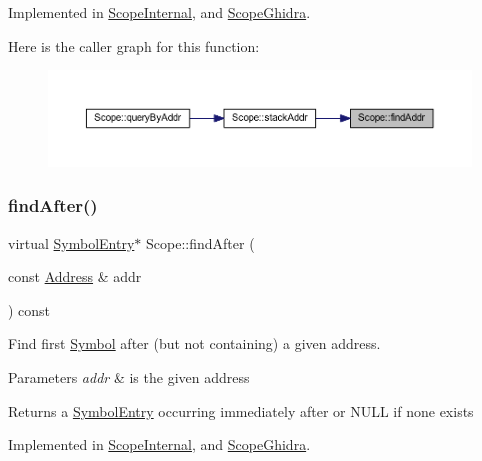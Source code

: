 Implemented in \mbox{\hyperlink{class_scope_internal_ac256d087718065edb1c3a96fbfdf7a33}{Scope\+Internal}}, and \mbox{\hyperlink{class_scope_ghidra_a444989f8c48787af5df27c2a8b234fd3}{Scope\+Ghidra}}.

Here is the caller graph for this function\+:
\nopagebreak
\begin{figure}[H]
\begin{center}
\leavevmode
\includegraphics[width=350pt]{class_scope_aae4ea61f9a55ddfc9defd8548654c8e5_icgraph}
\end{center}
\end{figure}
\mbox{\label{class_scope_a543041620f4398f00d2cc78edc1901b4}} 
\subsubsection{\texorpdfstring{findAfter()}{findAfter()}}
{\footnotesize\ttfamily virtual \mbox{\hyperlink{class_symbol_entry}{Symbol\+Entry}}$\ast$ Scope\+::find\+After (\begin{DoxyParamCaption}\item[{const \mbox{\hyperlink{class_address}{Address}} \&}]{addr }\end{DoxyParamCaption}) const\hspace{0.3cm}{\ttfamily [pure virtual]}}



Find first \mbox{\hyperlink{class_symbol}{Symbol}} after (but not containing) a given address. 


\begin{DoxyParams}{Parameters}
{\em addr} & is the given address \\
\hline
\end{DoxyParams}
\begin{DoxyReturn}{Returns}
a \mbox{\hyperlink{class_symbol_entry}{Symbol\+Entry}} occurring immediately after or N\+U\+LL if none exists 
\end{DoxyReturn}


Implemented in \mbox{\hyperlink{class_scope_internal_a922323cc754778858646c2bb82b69e17}{Scope\+Internal}}, and \mbox{\hyperlink{class_scope_ghidra_a0be881d3586a43ba0b8c4e412ab74005}{Scope\+Ghidra}}.

